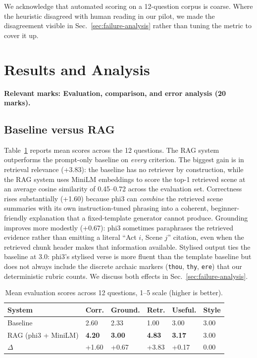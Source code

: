 \documentclass[10pt,twocolumn,a4paper]{article}
\begin{document}
We acknowledge that automated scoring on a 12-question corpus is
coarse. Where the heuristic disagreed with human reading in our pilot,
we made the disagreement visible in Sec.~\ref{sec:failure-analysis}
rather than tuning the metric to cover it up.

\section{Results and Analysis}
\label{sec:results}

\textbf{Relevant marks: Evaluation, comparison, and error analysis (20 marks).}

\subsection{Baseline versus RAG}

Table~\ref{tab:evaluation-summary} reports mean scores across the 12
questions. The RAG system outperforms the prompt-only baseline on
\emph{every} criterion. The biggest gain is in retrieval relevance
(+3.83): the baseline has no retriever by construction, while the
RAG system uses MiniLM embeddings to score the top-1 retrieved scene
at an average cosine similarity of 0.45--0.72 across the evaluation
set. Correctness rises substantially (+1.60) because phi3 can
\emph{combine} the retrieved scene summaries with its own
instruction-tuned phrasing into a coherent, beginner-friendly
explanation that a fixed-template generator cannot produce.
Grounding improves more modestly (+0.67): phi3 sometimes
paraphrases the retrieved evidence rather than emitting a literal
``Act $i$, Scene $j$'' citation, even when the retrieved chunk
header makes that information available. Stylised output ties
the baseline at 3.0: phi3's stylised verse is more fluent than the
template baseline but does not always include the discrete archaic
markers (\texttt{thou}, \texttt{thy}, \texttt{ere}) that our
deterministic rubric counts. We discuss both effects in
Sec.~\ref{sec:failure-analysis}.

\begin{table}[h]
\centering
\caption{Mean evaluation scores across 12 questions, 1--5 scale (higher is better).}
\label{tab:evaluation-summary}
\begin{tabularx}{\linewidth}{lXXXXX}
\toprule
System & Corr. & Ground. & Retr. & Useful. & Style \\
\midrule
Baseline                     & 2.60 & 2.33 & 1.00 & 3.00 & 3.00 \\
RAG (phi3 + MiniLM)          & \textbf{4.20} & \textbf{3.00} & \textbf{4.83} & \textbf{3.17} & 3.00 \\
\midrule
$\Delta$                    & +1.60 & +0.67 & +3.83 & +0.17 & 0.00 \\
\bottomrule
\end{tabularx}
\end{table}
\end{document}
